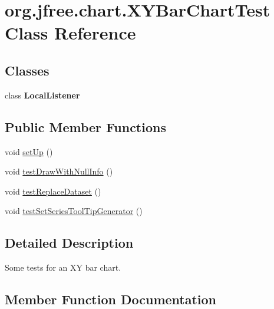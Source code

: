\hypertarget{classorg_1_1jfree_1_1chart_1_1_x_y_bar_chart_test}{}\section{org.\+jfree.\+chart.\+X\+Y\+Bar\+Chart\+Test Class Reference}
\label{classorg_1_1jfree_1_1chart_1_1_x_y_bar_chart_test}
\subsection*{Classes}
\begin{DoxyCompactItemize}
\item 
class {\bfseries Local\+Listener}
\end{DoxyCompactItemize}
\subsection*{Public Member Functions}
\begin{DoxyCompactItemize}
\item 
void \mbox{\hyperlink{classorg_1_1jfree_1_1chart_1_1_x_y_bar_chart_test_a935fc4b4f1a850fd6d018829051c327f}{set\+Up}} ()
\item 
void \mbox{\hyperlink{classorg_1_1jfree_1_1chart_1_1_x_y_bar_chart_test_a9fa92783b181269c7f434f4bb3dec1ba}{test\+Draw\+With\+Null\+Info}} ()
\item 
void \mbox{\hyperlink{classorg_1_1jfree_1_1chart_1_1_x_y_bar_chart_test_a2cb69e28d0ec72fd352b68ea54a536c4}{test\+Replace\+Dataset}} ()
\item 
void \mbox{\hyperlink{classorg_1_1jfree_1_1chart_1_1_x_y_bar_chart_test_a7eeca0cae9d0b486cc918484560000a1}{test\+Set\+Series\+Tool\+Tip\+Generator}} ()
\end{DoxyCompactItemize}


\subsection{Detailed Description}
Some tests for an XY bar chart. 

\subsection{Member Function Documentation}
\mbox{\label{classorg_1_1jfree_1_1chart_1_1_x_y_bar_chart_test_a935fc4b4f1a850fd6d018829051c327f}} 
